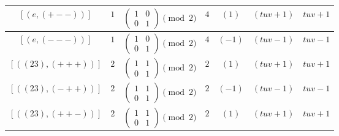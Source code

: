 \documentclass[11pt,english]{amsart}
\numberwithin{equation}{section}
\numberwithin{figure}{section}
\theoremstyle{plain}
\theoremstyle{plain}
\theoremstyle{definition}
\theoremstyle{remark}
\begin{document}
\begin{itemize}
\begin{table}[H]
\begin{tabular}{|c|c|c|c|c|c|c|}
        $[ (e, (+--)) ]$ & $1$ & $\begin{pmatrix} 1 & 0 \\ 0 & 1 \end{pmatrix}\pmod 2$ & $4$ & $(1)$ & $(tuv+1)$ & $tuv+1$ \\\hline
        
        $[ (e, (---)) ]$ & $1$ & $\begin{pmatrix} 1 & 0 \\ 0 & 1 \end{pmatrix}\pmod 2$ & $4$ & $(-1)$ & $(tuv-1)$ & $tuv-1$ \\\hline
        
        $[ ((23), (+++)) ]$ & $2$ & $\begin{pmatrix} 1 & 1 \\ 0 & 1 \end{pmatrix}\pmod 2$ & $2$ & $(1)$ & $(tuv+1)$ & $tuv+1$ \\\hline
        
        $[ ((23), (-++)) ]$ & $2$ & $\begin{pmatrix} 1 & 1 \\ 0 & 1 \end{pmatrix}\pmod 2$ & $2$ & $(-1)$ & $(tuv-1)$ & $tuv-1$ \\\hline
        
        $[ ((23), (++-)) ]$ & $2$ & $\begin{pmatrix} 1 & 1 \\ 0 & 1 \end{pmatrix}\pmod 2$ & $2$ & $(1)$ & $(tuv+1)$ & $tuv+1$ \\\hline
        

\end{tabular}
\end{table}
\end{itemize}
\end{document}
